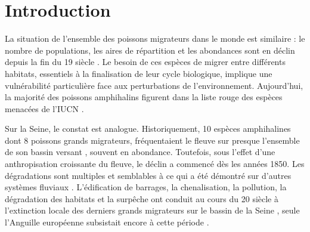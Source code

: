 \documentclass[11pt,twoside]{article}\usepackage[]{graphicx}\usepackage[table]{xcolor}
\begin{document}
 \setcounter{page}{1} 

\section{Introduction}

La situation de l'ensemble des poissons migrateurs dans le monde
est similaire : le nombre de populations,
les aires de répartition et les abondances sont en déclin depuis la fin du 19 siècle
\citep{saunders_atlantic_1981,bagliniere_reintroductions_1990,parrish_why_2011,jonsson_extinction_1999,
keith_atlas_2001,rochard_identification_2007,limburg_dramatic_2009}.
Le besoin de ces espèces de migrer entre différents habitats, essentiels à la finalisation
de leur cycle biologique, implique une vulnérabilité particulière face aux perturbations de l'environnement.
Aujourd'hui, la majorité des poissons amphihalins figurent dans la liste rouge
des espèces menacées de l'IUCN \citep{limburg_dramatic_2009}.

Sur la Seine, le constat est analogue. Historiquement, 10 espèces amphihalines dont 8 poissons grands migrateurs,
fréquentaient le fleuve sur presque l'ensemble de son bassin versant \citep{moreau_histoire_1881,moreau_les_1898,
poplin_peuplement_1952,euzenat_migren_1992,rochard_identification_2007}, souvent en abondance. Toutefois, sous l’effet d’une anthropisation croissante du fleuve, le déclin a commencé dès les années 1850. Les dégradations sont multiples et semblables à ce qui a été démontré sur d'autres systèmes fluviaux
\citep{nehlsen_pacific_2011,mcdowall_different_1999,lichatowich_depletion_1999,mckinnell_spatial_1999,
limburg_dramatic_2009}. L'édification de barrages, la chenalisation, la pollution, la dégradation des habitats et la surpêche ont conduit au cours du 20 siècle à l'extinction locale des derniers grands migrateurs sur le bassin de la Seine
\citep{euzenat_migren_1992,belliard_peuplement_1994,mouchel_bassin_1998,boet_multiple_1999,rochard_identification_2007},
seule l'Anguille européenne subsistait encore à cette période \citep{boet_multiple_1999,rochard_identification_2007}.
\end{document}
